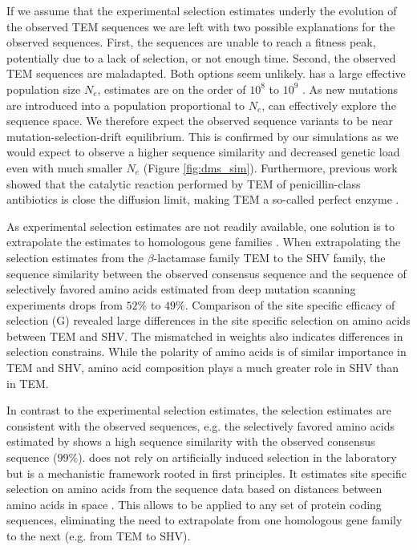 \documentclass[12pt]{article}
\begin{document}

If we assume that the experimental selection estimates underly the evolution of the observed TEM sequences we are left with two possible explanations for the observed sequences.
First, the sequences are unable to reach a fitness peak, potentially due to a lack of selection, or not enough time.
Second, the observed TEM sequences are maladapted.
Both options seem unlikely.
\ecoli has a large effective population size $N_e$, estimates are on the order of $10^8$ to $10^9$ \citep{OchmanAndWilson1987, hartl1994}.
As new mutations are introduced into a population proportional to $N_e$, \ecoli can effectively explore the sequence space.
We therefore expect the observed sequence variants to be near mutation-selection-drift equilibrium.
This is confirmed by our simulations as we would expect to observe a higher sequence similarity and decreased genetic load even with much smaller $N_e$ (Figure \ref{fig:dms_sim}).
Furthermore, previous work showed that the catalytic reaction performed by TEM of penicillin-class antibiotics is close the diffusion limit, making TEM a so-called perfect enzyme \citep{matagne1998}.

As experimental selection estimates are not readily available, one solution is to extrapolate the estimates to homologous gene families \citep{bloom2014, bloom2017}.
When extrapolating the selection estimates from the $\beta$-lactamase family TEM to the SHV family, the sequence similarity between the observed consensus sequence and the sequence of selectively favored amino acids estimated from deep mutation scanning experiments drops from $52 \% $ to $49 \%$.
Comparison of the site specific efficacy of selection (G) revealed large differences in the site specific selection on amino acids between TEM and SHV.
The mismatched in \PC weights also indicates differences in selection constrains. 
While the polarity of amino acids is of similar importance in TEM and SHV, amino acid composition plays a much greater role in SHV than in TEM.

In contrast to the experimental selection estimates, the \selac selection estimates are consistent with the observed sequences, e.g. the selectively favored amino acids estimated by \selac shows a high sequence similarity with the observed consensus sequence ($99 \%$).
\selac does not rely on artificially induced selection in the laboratory but is a mechanistic framework rooted in first principles.
It estimates site specific selection on amino acids from the sequence data based on distances between amino acids in \PC space \citep{grantham1974,beaulieu2018}.
This allows \selac to be applied to any set of protein coding sequences, eliminating the need to extrapolate from one homologous gene family to the next (e.g. from TEM to SHV).
\end{document}
